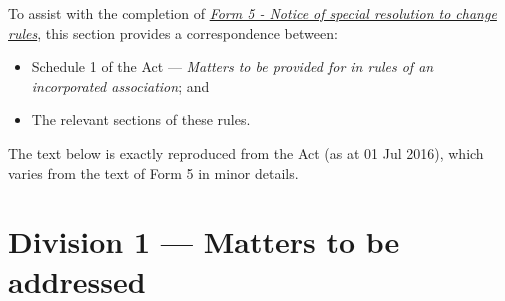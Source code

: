 \documentclass[../constitution.tex]{subfiles}
\begin{document}

To assist with the completion of \href{https://www.commerce.wa.gov.au/publications/notice-special-resolution-change-rules}{\textit{Form 5 - Notice of special resolution to change rules}}, this section provides a correspondence between:

\begin{itemize}
    \item Schedule 1 of the Act --- \textit{Matters to be provided for in rules of an incorporated association}; and
    \item The relevant sections of these rules.
\end{itemize}

The text below is exactly reproduced from the Act (as at 01 Jul 2016), which varies from the text of Form 5 in minor details.

\section*{Division 1 — Matters to be addressed}
\end{document}

